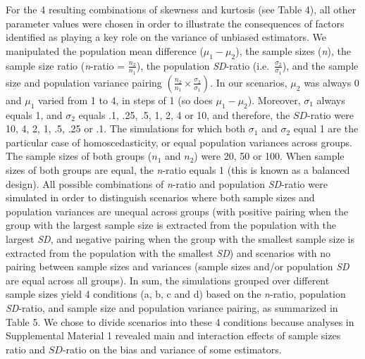\documentclass[
  12pt,
  french,
]{article}
\begin{document}
For the 4 resulting combinations of skewness and kurtosis (see Table 4),
all other parameter values were chosen in order to illustrate the
consequences of factors identified as playing a key role on the variance
of unbiased estimators. We manipulated the population mean difference
(\(\mu_1-\mu_2\)), the sample sizes (\emph{n}), the sample size ratio
(\emph{n}-ratio = \(\frac{n_2}{n_1}\)), the population \emph{SD}-ratio
(i.e.~\(\frac{\sigma_2}{\sigma_1}\)), and the sample size and population
variance pairing
\(\left(\frac{n_2}{n_1}\times\frac{\sigma_2}{\sigma_1} \right)\). In our
scenarios, \(\mu_2\) was always 0 and \(\mu_1\) varied from 1 to 4, in
steps of 1 (so does
\(\mu_1-\mu_2\)).
Moreover, \(\sigma_1\) always equals 1, and \(\sigma_2\) equals .1, .25,
.5, 1, 2, 4 or 10, and therefore, the \(SD\)-ratio were 10, 4, 2, 1, .5,
.25 or .1. The simulations for which both \(\sigma_1\) and \(\sigma_2\)
equal 1 are the particular case of homoscedasticity, or equal population
variances across groups. The sample sizes of both groups (\(n_1\) and
\(n_2\)) were 20, 50 or 100. When sample sizes of both groups are equal,
the \emph{n}-ratio equals 1 (this is known as a balanced design). All
possible combinations of \emph{n}-ratio and population \emph{SD}-ratio
were simulated in order to distinguish scenarios where both sample sizes
and population variances are unequal across groups (with positive
pairing when the group with the largest sample size is extracted from
the population with the largest \emph{SD}, and negative pairing when the
group with the smallest sample size is extracted from the population
with the smallest \emph{SD}) and scenarios with no pairing between
sample sizes and variances (sample sizes and/or population \emph{SD} are
equal across all groups). In sum, the simulations grouped over different
sample sizes yield 4 conditions (a, b, c and d) based on the
\emph{n}-ratio, population \emph{SD}-ratio, and sample size and
population variance pairing, as summarized in Table 5. We chose to
divide scenarios into these 4 conditions because analyses in
Supplemental Material 1 revealed main and interaction effects of sample
sizes ratio and \(SD\)-ratio on the bias and variance of some
estimators.
\end{document}
